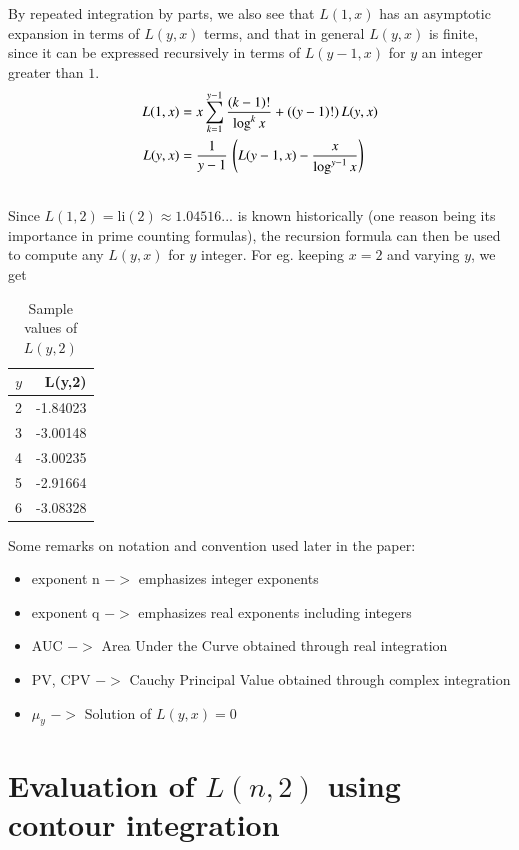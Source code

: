 \documentclass[a4paper,11pt,twoside]{amsart}
\newcommand\li{\mathrm{li}}
\begin{document}
By repeated integration by parts, we also see that $L(1,x)$ has an asymptotic expansion in terms of $L(y,x)$ terms, and that in general $L(y,x)$ is finite, since it can be expressed recursively in terms of $L(y-1,x)$ for $y$ an integer greater than $1$.
\begin{align}
L(1,x) &= x\sum\limits_{k=1}^{y-1} \frac{(k-1)!}{\log^{k} x} + ((y-1)!)\,L(y,x)  \\
L(y,x) &= \frac{1}{y-1} \, \left(L(y-1,x) - \frac{x}{\log^{y-1} x}\right) \\
\notag
\end{align}
Since $L(1,2) = \li(2) \approx 1.04516...$ \cite{weis} is known historically (one reason being its importance in prime counting formulas), the recursion formula can then be used to compute any $L(y,x)$ for $y$ integer. For eg. keeping $x=2$ and varying $y$, we get
\begin{table}[H]
  \begin{tabular}{r|r} %
      $y$ & L(y,2)\\
      \hline
      2 & -1.84023\\
      3 & -3.00148\\
      4 & -3.00235\\
      5 & -2.91664\\
      6 & -3.08328\\
  \end{tabular}
  \caption{Sample values of $L(y,2)$}
\end{table}
\vspace{-2em}

Some remarks on notation and convention used later in the paper:
\begin{itemize}
 \item exponent n $->$ emphasizes integer exponents
 \item exponent q $->$ emphasizes real exponents including integers
 \item AUC $->$ Area Under the Curve obtained through real integration
 \item PV, CPV $->$ Cauchy Principal Value obtained through complex integration 
 \item $\mu_y$ $->$ Solution of $L(y,x)=0$
\end{itemize}

\section{Evaluation of $L(n,2)$ using contour integration}
\end{document}
